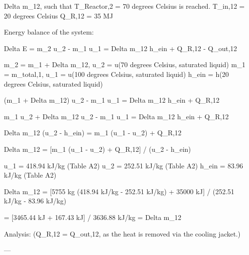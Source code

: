 Delta m_12, such that T_Reactor,2 = 70 degrees Celsius is reached.  
T_in,12 = 20 degrees Celsius  
Q_R,12 = 35 MJ  

Energy balance of the system:  

Delta E = m_2 u_2 - m_1 u_1 = Delta m_12 h_ein + Q_R,12 - Q_out,12  

m_2 = m_1 + Delta m_12, u_2 = u(70 degrees Celsius, saturated liquid)  
m_1 = m_total,1, u_1 = u(100 degrees Celsius, saturated liquid)  
h_ein = h(20 degrees Celsius, saturated liquid)  

(m_1 + Delta m_12) u_2 - m_1 u_1 = Delta m_12 h_ein + Q_R,12  

m_1 u_2 + Delta m_12 u_2 - m_1 u_1 = Delta m_12 h_ein + Q_R,12  

Delta m_12 (u_2 - h_ein) = m_1 (u_1 - u_2) + Q_R,12  

Delta m_12 = [m_1 (u_1 - u_2) + Q_R,12] / (u_2 - h_ein)  

u_1 = 418.94 kJ/kg (Table A2)  
u_2 = 252.51 kJ/kg (Table A2)  
h_ein = 83.96 kJ/kg (Table A2)  

Delta m_12 = [5755 kg (418.94 kJ/kg - 252.51 kJ/kg) + 35000 kJ] / (252.51 kJ/kg - 83.96 kJ/kg)  

= [3465.44 kJ + 167.43 kJ] / 3636.88 kJ/kg = Delta m_12  

Analysis:  
(Q_R,12 = Q_out,12, as the heat is removed via the cooling jacket.)  

---